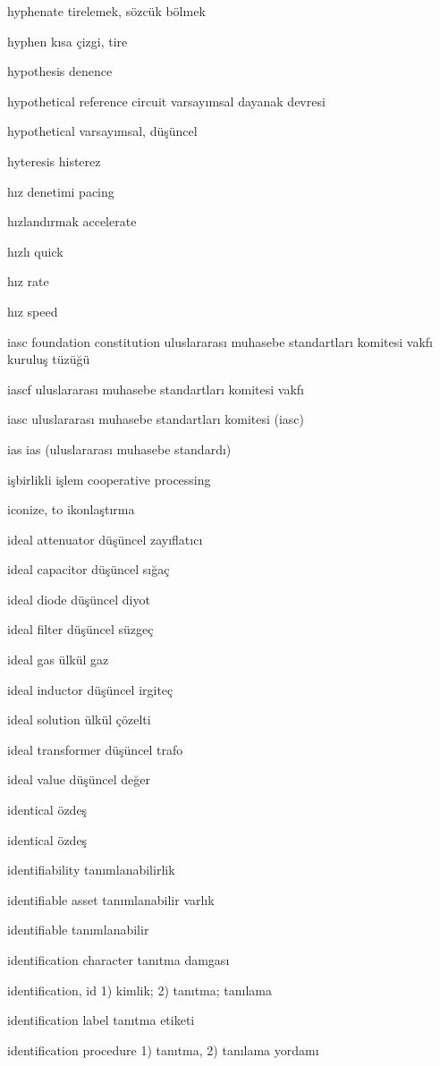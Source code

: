 \documentclass[12pt,fleqn]{article}\usepackage{../../common}
\begin{document}
hyphenate tirelemek, sözcük bölmek

hyphen kısa çizgi, tire

hypothesis denence

hypothetical reference circuit varsayımsal dayanak devresi

hypothetical varsayımsal, düşüncel

hyteresis histerez

hız denetimi pacing

hızlandırmak accelerate

hızlı quick

hız rate

hız speed

iasc foundation constitution uluslararası muhasebe standartları komitesi vakfı kuruluş tüzüğü

iascf uluslararası muhasebe standartları komitesi vakfı

iasc uluslararası muhasebe standartları komitesi (iasc)

ias ias (uluslararası muhasebe standardı)

işbirlikli işlem cooperative processing

iconize, to ikonlaştırma

ideal attenuator düşüncel zayıflatıcı

ideal capacitor düşüncel sığaç

ideal diode düşüncel diyot

ideal filter düşüncel süzgeç

ideal gas ülkül gaz

ideal inductor düşüncel irgiteç

ideal solution ülkül çözelti

ideal transformer düşüncel trafo

ideal value düşüncel değer

identical özdeş

identical özdeş

identifiability tanımlanabilirlik

identifiable asset tanımlanabilir varlık

identifiable tanımlanabilir

identification character tanıtma damgası

identification, id 1) kimlik; 2) tanıtma; tanılama

identification label tanıtma etiketi

identification procedure 1) tanıtma, 2) tanılama yordamı
\end{document}
